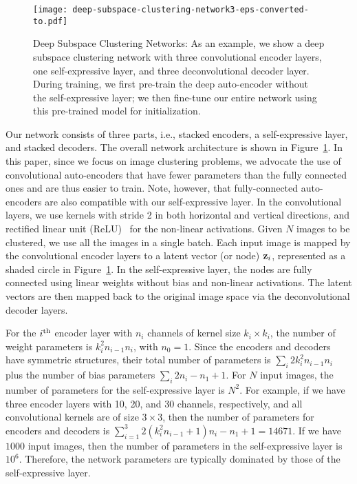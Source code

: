 \documentclass{article}
\begin{document}
\begin{figure}[!t]
\centering
\texttt{[image: deep-subspace-clustering-network3-eps-converted-to.pdf]}
\caption{Deep Subspace Clustering Networks: As an example, we show a deep subspace clustering network with three convolutional encoder layers, one self-expressive layer, and three deconvolutional decoder layer. During training, we first pre-train the deep auto-encoder without the self-expressive layer; we then fine-tune our entire network using this pre-trained model for initialization.}\label{fig:dscn}
\vspace{-0.4cm}
\end{figure}

Our network consists of three parts, i.e., stacked encoders, a self-expressive layer, and stacked decoders. The overall network architecture is shown in Figure~\ref{fig:dscn}.
In this paper, since we focus on image clustering problems, we advocate the use of convolutional auto-encoders that have fewer parameters than the fully connected ones and are thus easier to train. Note, however, that fully-connected auto-encoders are also compatible with our self-expressive layer. In the convolutional layers, we use kernels with stride 2 in both horizontal and vertical directions, and rectified linear unit (ReLU)~\cite{krizhevsky2012imagenet} for the non-linear activations. Given $N$ images to be clustered, we use all the images in a single batch. 
Each input image is mapped by the convolutional encoder layers to a latent vector (or node) ${\bf z}_i$, represented as a shaded circle in Figure~\ref{fig:dscn}. 
In the self-expressive layer, the nodes are fully connected using linear weights without bias and non-linear activations. The latent vectors are then mapped back to the original image space via the deconvolutional decoder layers.

For the $i^{\rm th}$ encoder layer with $n_i$ channels of kernel size $k_i\times k_i$, the number of weight parameters is $k_i^2 n_{i-1} n_i$, with $n_0 = 1$. 
Since the encoders and decoders have symmetric structures, their total number of  parameters is $\sum_i 2k_i^2 n_{i-1} n_i$ plus the number of bias parameters $\sum_i 2n_i - n_1 + 1$. For $N$ input images, the number of parameters for the self-expressive layer is $N^2$. For example, if we have three encoder layers with 10, 20, and 30 channels, respectively, and all convolutional kernels are of size $3\times 3$, then the number of parameters for encoders and decoders is $\sum_{i=1}^3 2(k_i^2 n_{i-1} + 1)n_i - n_1 + 1 = 14671$. If we have $1000$ input images, then the number of parameters in the self-expressive layer is $10^6$. Therefore, the network parameters are typically dominated by those of the self-expressive layer.
\end{document}
